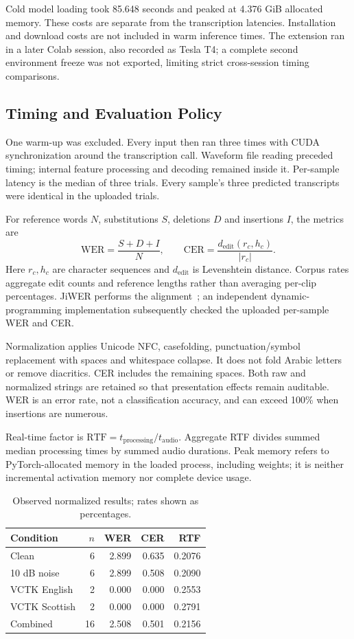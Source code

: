 \documentclass[conference]{IEEEtran}
\begin{document}
Cold model loading took 85.648 seconds and peaked at 4.376 GiB allocated memory. These costs are separate from the transcription latencies. Installation and download costs are not included in warm inference times. The extension ran in a later Colab session, also recorded as Tesla T4; a complete second environment freeze was not exported, limiting strict cross-session timing comparisons.

\subsection{Timing and Evaluation Policy}
One warm-up was excluded. Every input then ran three times with CUDA synchronization around the transcription call. Waveform file reading preceded timing; internal feature processing and decoding remained inside it. Per-sample latency is the median of three trials. Every sample's three predicted transcripts were identical in the uploaded trials.

For reference words $N$, substitutions $S$, deletions $D$ and insertions $I$, the metrics are
\begin{equation}
\mathrm{WER}=\frac{S+D+I}{N},\qquad
\mathrm{CER}=\frac{d_{\mathrm{edit}}(r_c,h_c)}{|r_c|}.
\end{equation}
Here $r_c,h_c$ are character sequences and $d_{\mathrm{edit}}$ is Levenshtein distance. Corpus rates aggregate edit counts and reference lengths rather than averaging per-clip percentages. JiWER performs the alignment~\cite{jiwer}; an independent dynamic-programming implementation subsequently checked the uploaded per-sample WER and CER.

Normalization applies Unicode NFC, casefolding, punctuation/symbol replacement with spaces and whitespace collapse. It does not fold Arabic letters or remove diacritics. CER includes the remaining spaces. Both raw and normalized strings are retained so that presentation effects remain auditable. WER is an error rate, not a classification accuracy, and can exceed 100\% when insertions are numerous.

Real-time factor is $\mathrm{RTF}=t_{\mathrm{processing}}/t_{\mathrm{audio}}$. Aggregate RTF divides summed median processing times by summed audio durations. Peak memory refers to PyTorch-allocated memory in the loaded process, including weights; it is neither incremental activation memory nor complete device usage.

\begin{table}[t]
\caption{Observed normalized results; rates shown as percentages.}
\label{tab:summary}\centering\small
\begin{tabular}{lrrrr}\toprule
Condition & $n$ & WER & CER & RTF\\\midrule
Clean & 6 & 2.899 & 0.635 & 0.2076\\
10 dB noise & 6 & 2.899 & 0.508 & 0.2090\\
VCTK English & 2 & 0.000 & 0.000 & 0.2553\\
VCTK Scottish & 2 & 0.000 & 0.000 & 0.2791\\
Combined & 16 & 2.508 & 0.501 & 0.2156\\\bottomrule
\end{tabular}
\end{table}
\end{document}
